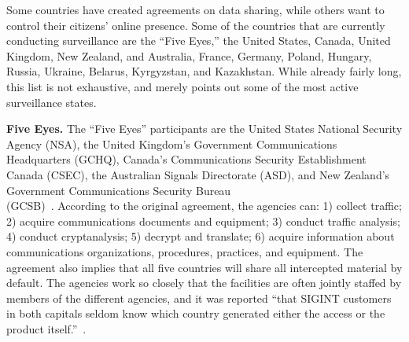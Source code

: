 Some countries have created agreements on data sharing, while others want to control their citizens' online presence.  Some of the countries that are currently conducting surveillance are the ``Five Eyes,'' the United States, Canada, United Kingdom, New Zealand, and Australia, France, Germany, Poland, Hungary, Russia, Ukraine, Belarus, Kyrgyzstan, and Kazakhstan.  While already fairly long, this list is not exhaustive, and merely points out some of the most active surveillance states.

{\bf Five Eyes.} The ``Five Eyes'' participants are the United States National Security Agency (NSA), the United Kingdom's Government Communications Headquarters (GCHQ), Canada's Communications Security Establishment Canada (CSEC), the Australian Signals Directorate (ASD), and New Zealand's Government Communications Security Bureau \\(GCSB)~\cite{eyeswideopen}.  According to the original agreement, the agencies can: 1) collect traffic; 2) acquire communications documents and equipment; 3) conduct traffic analysis; 4) conduct cryptanalysis; 5) decrypt and translate; 6) acquire information about communications organizations, procedures, practices, and equipment.  The agreement also implies that all five countries will share all intercepted material by default.  The agencies work so closely that the facilities are often jointly staffed by members of the different agencies, and it was reported ``that SIGINT customers in both capitals seldom know which country generated either the access or the product itself.''~\cite{lander2004international}.

